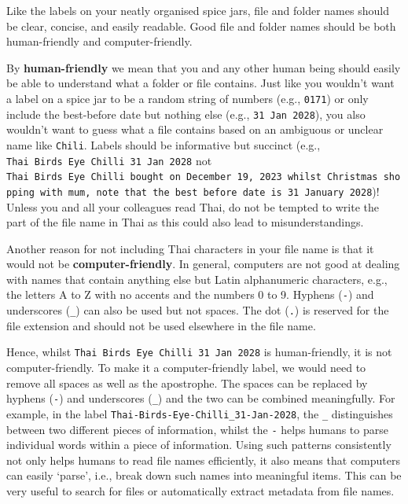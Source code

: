 \documentclass[
  letterpaper,
  DIV=11,
  numbers=noendperiod]{scrreprt}
\begin{document}
Like the labels on your neatly organised spice jars, file and folder
names should be clear, concise, and easily readable. Good file and
folder names should be both human-friendly and computer-friendly.

By \textbf{human-friendly} we mean that you and any other human being
should easily be able to understand what a folder or file contains. Just
like you wouldn't want a label on a spice jar to be a random string of
numbers (e.g., \texttt{0171}) or only include the best-before date but
nothing else (e.g., \texttt{31\ Jan\ 2028}), you also wouldn't want to
guess what a file contains based on an ambiguous or unclear name like
\texttt{Chili}. Labels should be informative but succinct (e.g.,
\texttt{Thai\ Bird\textquotesingle{}s\ Eye\ Chilli\ 31\ Jan\ 2028} not
\texttt{Thai\ Bird\textquotesingle{}s\ Eye\ Chilli\ bought\ on\ December\ 19,\ 2023\ whilst\ Christmas\ shopping\ with\ mum,\ note\ that\ the\ best\ before\ date\ is\ 31\ January\ 2028})!
Unless you and all your colleagues read Thai, do not be tempted to write
the part of the file name in Thai as this could also lead to
misunderstandings.

Another reason for not including Thai characters in your file name is
that it would not be \textbf{computer-friendly}. In general, computers
are not good at dealing with names that contain anything else but Latin
alphanumeric characters, e.g., the letters A to Z with no accents and
the numbers 0 to 9. Hyphens (\texttt{-}) and underscores (\texttt{\_})
can also be used but not spaces. The dot (\texttt{.}) is reserved for
the file extension and should not be used elsewhere in the file name.

Hence, whilst
\texttt{Thai\ Bird\textquotesingle{}s\ Eye\ Chilli\ 31\ Jan\ 2028} is
human-friendly, it is not computer-friendly. To make it a
computer-friendly label, we would need to remove all spaces as well as
the apostrophe. The spaces can be replaced by hyphens (\texttt{-}) and
underscores (\texttt{\_}) and the two can be combined meaningfully. For
example, in the label \texttt{Thai-Birds-Eye-Chilli\_31-Jan-2028}, the
\texttt{\_} distinguishes between two different pieces of information,
whilst the \texttt{-} helps humans to parse individual words within a
piece of information. Using such patterns consistently not only helps
humans to read file names efficiently, it also means that computers can
easily `parse', i.e., break down such names into meaningful items. This
can be very useful to search for files or automatically extract metadata
from file names.
\end{document}
